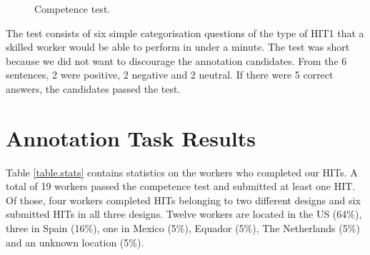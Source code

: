 \documentclass[11pt, a4paper,onecolumn]{article}
\begin{document}
\begin{figure}[h]
  \begin{center}
	\caption{Competence test.}
	\label{comtest}
  \end{center}
\end{figure}


The test consists of six simple categorisation questions of the type of HIT1 that a skilled worker would be able to perform in under a minute. The test was short because we did not want to discourage the annotation candidates. From the 6 sentences, 2 were positive, 2 negative and 2 neutral. If there were 5 correct answers, the candidates passed the test. 


\section{Annotation Task Results}
\label{sect:results}


Table \ref{table.stats} contains statistics on the workers who completed our HITs. A total of 19 workers passed the competence test and submitted at least one HIT. Of those, four workers completed HITs belonging to two different designs and six submitted HITs in all three designs. Twelve workers are located in the US (64\%), three in Spain (16\%), one in Mexico (5\%), Equador (5\%), The Netherlands (5\%) and an unknown location (5\%).
\end{document}
